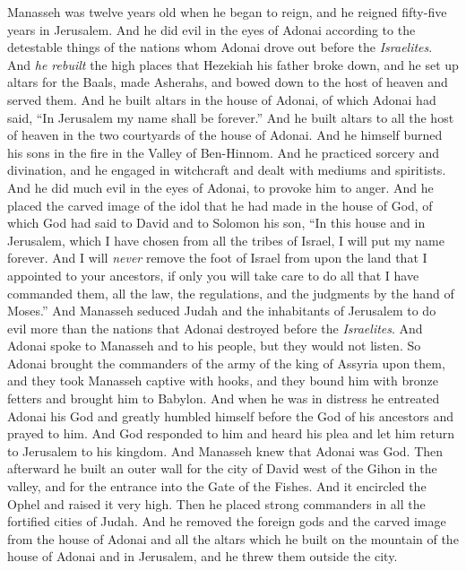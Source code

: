 \begin{biblechapter} %
 Manasseh was twelve years old when he began to reign, and he reigned fifty-five years in Jerusalem.
\verse And he did evil in the eyes of Adonai according to the detestable things of the nations whom Adonai drove out before the \textit{Israelites}.
\verse And \textit{he rebuilt} the high places that Hezekiah his father broke down, and he set up altars for the Baals, made Asherahs, and bowed down to the host of heaven and served them.
\verse And he built altars in the house of Adonai, of which Adonai had said, “In Jerusalem my name shall be forever.”
\verse And he built altars to all the host of heaven in the two courtyards of the house of Adonai.
\verse And he himself burned his sons in the fire in the Valley of Ben-Hinnom. And he practiced sorcery and divination, and he engaged in witchcraft and dealt with mediums and spiritists. And he did much evil in the eyes of Adonai, to provoke him to anger.
\verse And he placed the carved image of the idol that he had made in the house of God, of which God had said to David and to Solomon his son, “In this house and in Jerusalem, which I have chosen from all the tribes of Israel, I will put my name forever.
\verse And I will \textit{never} remove the foot of Israel from upon the land that I appointed to your ancestors, if only you will take care to do all that I have commanded them, all the law, the regulations, and the judgments by the hand of Moses.”
\verse And Manasseh seduced Judah and the inhabitants of Jerusalem to do evil more than the nations that Adonai destroyed before the \textit{Israelites}.
 And Adonai spoke to Manasseh and to his people, but they would not listen.
\verse So Adonai brought the commanders of the army of the king of Assyria upon them, and they took Manasseh captive with hooks, and they bound him with bronze fetters and brought him to Babylon.
\verse And when he was in distress he entreated Adonai his God and greatly humbled himself before the God of his ancestors
\verse and prayed to him. And God responded to him and heard his plea and let him return to Jerusalem to his kingdom. And Manasseh knew that Adonai was God.
\verse Then afterward he built an outer wall for the city of David west of the Gihon in the valley, and for the entrance into the Gate of the Fishes. And it encircled the Ophel and raised it very high. Then he placed strong commanders in all the fortified cities of Judah.
\verse And he removed the foreign gods and the carved image from the house of Adonai and all the altars which he built on the mountain of the house of Adonai and in Jerusalem, and he threw them outside the city.

\end{biblechapter}
